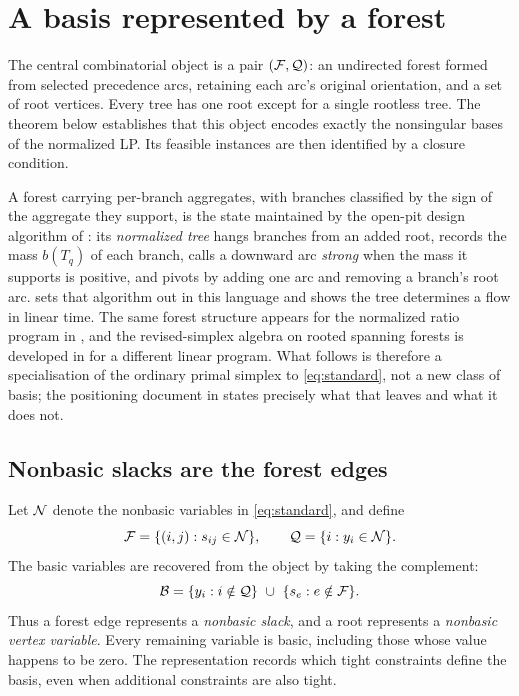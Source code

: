 \section{A basis represented by a forest}\label{sec:forest}

The central combinatorial object is a pair $(\mathcal F,\mathcal Q)$: an undirected
forest formed from selected precedence arcs, retaining each arc's original
orientation, and a set of root vertices. Every tree has one root except
for a single rootless tree. The theorem below establishes that this object
encodes exactly the nonsingular bases of the normalized LP. Its feasible
instances are then identified by a closure condition.

\begin{remark}
A forest carrying per-branch aggregates, with branches classified by the sign of
the aggregate they support, is the state maintained by the open-pit design
algorithm of \citet{LerchsGrossmann1965}: its \emph{normalized tree} hangs
branches from an added root, records the mass $b(T_q)$ of each branch, calls a
downward arc \emph{strong} when the mass it supports is positive, and pivots by
adding one arc and removing a branch's root arc. \citet{Hochbaum2001} sets that
algorithm out in this language and shows the tree determines a flow in linear
time. The same forest structure appears for the normalized ratio program in
\citet{Wuille2025}, and the revised-simplex algebra on rooted spanning forests
is developed in \citet{Yang2026} for a different linear program. What follows is
therefore a specialisation of the ordinary primal simplex to
\eqref{eq:standard}, not a new class of basis; the positioning document in
 states precisely what that leaves and what it does not.
\end{remark}

\subsection{Nonbasic slacks are the forest edges}
Let $\mathcal N$ denote the nonbasic variables in \eqref{eq:standard}, and define
\[
 \mathcal F=\{(i,j):s_{ij}\in\mathcal N\},\qquad
\mathcal Q=\{i:y_i\in\mathcal N\}.
\]
The basic variables are recovered from the object by taking the complement:
\[
 \Bset=\{y_i:i\notin\Qset\}\ \cup\ \{s_e:e\notin\Fset\}.
\]
Thus a forest edge represents a \emph{nonbasic slack}, and a root represents
a \emph{nonbasic vertex variable}. Every remaining variable is basic, including
those whose value happens to be zero. The representation records which tight
constraints define the basis, even when additional constraints are also tight.


